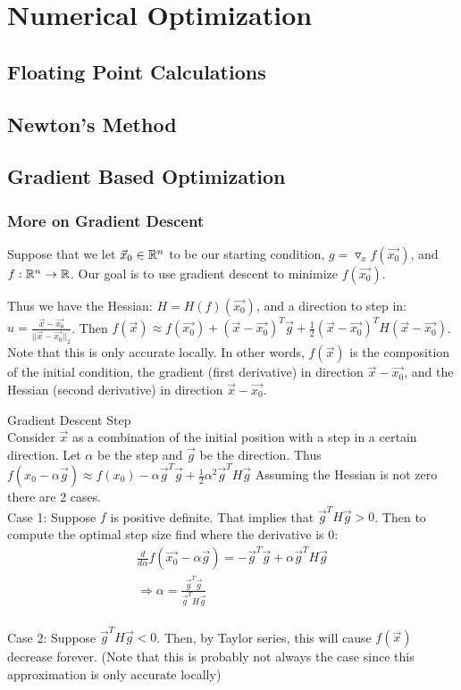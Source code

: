 

\chapter{Numerical Optimization}
\label{numerics}

\section{Floating Point Calculations}

\section{Newton's Method}

\section{Gradient Based Optimization}
\label{gradient-optimization}

\subsection{More on Gradient Descent}
\label{gradient descent}
Suppose that we let $\vec{x}_0\in \R^n$ to be our starting condition,
$g=\triangledown_x f(\vec{x_0})$, and $f: \R^n\rightarrow\R$.
Our goal is to use gradient descent to minimize $f(\vec{x_0})$.

Thus we have the Hessian: $H=H(f)(\vec{x_0})$, and a direction to step in:  $\hat{u}=\frac{\vec{x}-\vec{x_0}}{||\vec{x}-\vec{x_0}||_2}$. Then $f(\vec{x})\approx f(\vec{x_0})+(\vec{x}-\vec{x_0})^T\vec{g}+\frac{1}{2}(\vec{x}-\vec{x_0})^TH(\vec{x}-\vec{x_0})$. Note that this is only accurate locally. In other words, $f(\vec{x})$ is the composition of the initial condition, the gradient (first derivative) in direction $\vec{x}-\vec{x_0}$, and the Hessian (second derivative) in direction $\vec{x}-\vec{x_0}$.

\begin{definition}
Gradient Descent Step\\
Consider $\vec{x}$ as a combination of the initial position with a step in a certain direction. Let $\alpha$ be the step and $\vec{g}$ be the direction.
Thus $f(x_0-\alpha\vec{g})\approx f(x_0)-\alpha \vec{g}^T\vec{g}+\frac{1}{2}\alpha^2\vec{g}^TH\vec{g}$ Assuming the Hessian is not zero there are 2 cases.\\
Case 1: Suppose $f$ is positive definite. That implies that $\vec{g}^TH\vec{g}>0$. Then to compute the optimal step size find where the derivative is 0:
\begin{align*}
    \frac{d}{d\alpha}f(\vec{x_0}-\alpha \vec{g})=-\vec{g}^T\vec{g}+\alpha\vec{g}^TH\vec{g}\\
    \Longrightarrow \alpha=\frac{\vec{g}^T\vec{g}}{\vec{g}^TH\vec{g}}
\end{align*}\\
Case 2: Suppose $\vec{g}^TH\vec{g}<0$. Then, by Taylor series, this will cause $f(\vec{x})$ decrease forever. (Note that this is probably not always the case since this approximation is only accurate locally)\\
\end{definition}

